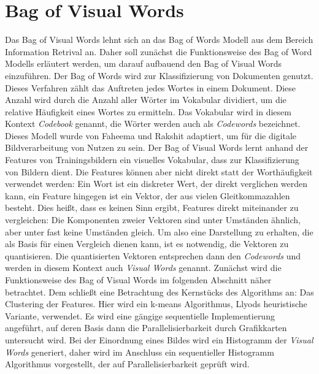 \section{Bag of Visual Words}

Das Bag of Visual Words lehnt sich an das Bag of Words Modell aus dem Bereich Information Retrival an. Daher soll zunächst die Funktionsweise des Bag of Word Modells erläutert werden, um darauf aufbauend den Bag of Visual Words einzuführen.\newline 
Der Bag of Words wird zur Klassifizierung von Dokumenten genutzt. Dieses Verfahren zählt das Auftreten jedes Wortes in einem Dokument. Diese Anzahl wird durch die Anzahl aller Wörter im Vokabular dividiert, um die relative Häufigkeit eines Wortes zu ermitteln. Das Vokabular wird in diesem Kontext \textit{Codebook} genannt, die Wörter werden auch als \textit{Codewords} bezeichnet.\newline
Dieses Modell wurde von Faheema und Rakshit \cite{bow2010} adaptiert, um für die digitale Bildverarbeitung von Nutzen zu sein. Der Bag of Visual Words lernt anhand der Features von Trainingsbildern ein visuelles Vokabular, dass zur Klassifizierung von Bildern dient. Die Features können aber nicht direkt statt der Worthäufigkeit verwendet werden: Ein Wort ist ein diskreter Wert, der direkt verglichen werden kann, ein Feature hingegen ist ein Vektor, der aus vielen Gleitkommazahlen besteht. Dies heißt, dass es keinen Sinn ergibt, Features direkt miteinander zu vergleichen: Die Komponenten zweier Vektoren sind unter Umständen ähnlich, aber unter fast keine Umständen gleich. Um also eine Darstellung zu erhalten, die als Basis für einen Vergleich dienen kann, ist es notwendig, die Vektoren zu quantisieren. Die quantisierten Vektoren entsprechen dann den \textit{Codewords} und werden in diesem Kontext auch \textit{Visual Words} genannt. \newline
Zunächst wird die Funktionsweise des Bag of Visual Words im folgenden Abschnitt näher betrachtet. Dem schließt eine Betrachtung des Kernstücks des Algorithms an: Das Clustering der Features. Hier wird ein k-means Algorithmus, Llyods heuristische Variante, verwendet. Es wird eine gängige sequentielle Implementierung angeführt, auf deren Basis dann die Parallelisierbarkeit durch Grafikkarten untersucht wird.\newline
Bei der Einordnung eines Bildes wird ein Histogramm der \textit{Visual Words} generiert, daher wird im Anschluss ein sequentieller Histogramm Algorithmus vorgestellt, der auf Parallelisierbarkeit geprüft wird.


